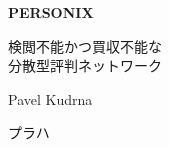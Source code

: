 \thispagestyle{empty}
\begin{center}
  {\sffamily\bfseries\fontsize{34}{40}\selectfont PERSONIX\par}
  \vspace{2.2em}
  {\rmfamily\large 検閲不能かつ買収不能な\\[0.25em]
   分散型評判ネットワーク\par}
\end{center}
\begin{center}
  {\rmfamily\Large Pavel Kudrna\par}
  \vspace{0.45em}
  {\rmfamily\small プラハ\quad\textbullet{}\par}
\end{center}
\clearpage
